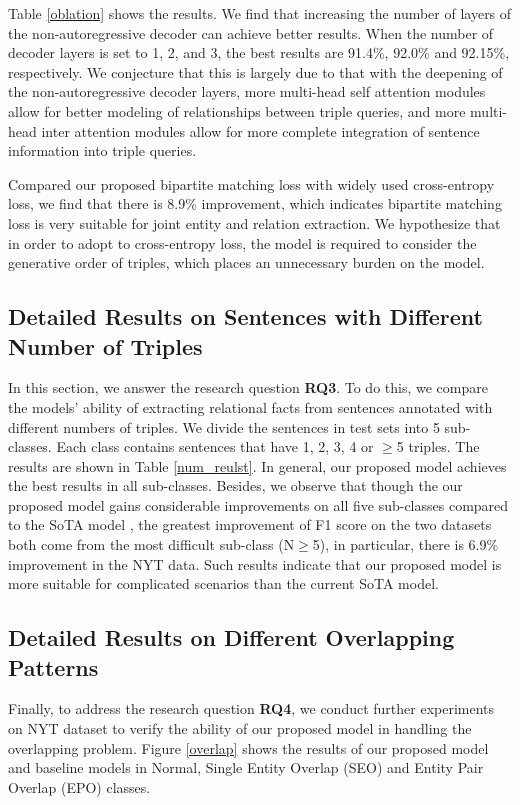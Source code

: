 \documentclass[letterpaper]{article} \usepackage{aaai21}  \usepackage{times}  \usepackage{helvet} \usepackage{courier}  \usepackage[hyphens]{url}  \usepackage{graphicx} \usepackage{amsfonts,amssymb}
\begin{document}
Table \ref{oblation} shows the results. We find that increasing the number of layers of the non-autoregressive decoder can achieve better results. When the number of decoder layers is set to 1, 2, and 3, the best results are 91.4\%, 92.0\% and 92.15\%, respectively. We conjecture that this is largely due to that with the deepening of the non-autoregressive decoder layers,  more multi-head self attention modules allow for better modeling of relationships between triple queries, and more multi-head inter attention modules allow for more complete integration of sentence information into triple queries. 

Compared our proposed bipartite matching loss with widely used cross-entropy loss, we find that there is 8.9\% improvement, which indicates bipartite matching loss is very suitable for joint entity and relation extraction. We hypothesize that in order to adopt to cross-entropy loss, the model is required to consider the generative order of triples, which places an unnecessary burden on the model.


\subsection{Detailed Results on Sentences with Different Number of Triples}
In this section, we answer the research question \textbf{RQ3}. To do this, we compare the models' ability of extracting relational facts from sentences annotated with different numbers of triples. We divide the sentences in test sets into 5 sub-classes. Each class contains sentences that have 1, 2, 3, 4 or $\geq$5 triples. The results are shown in Table \ref{num_reulst}. In general, our proposed model achieves the best results in all sub-classes. Besides, we observe that though the our proposed model gains considerable improvements on all five sub-classes compared to the SoTA model \cite{wei-etal-2020-novel}, the greatest improvement of F1 score on the two datasets both come from the most difficult sub-class (N$\geq$5), in particular, there is 6.9\% improvement in the NYT data. Such results indicate that our proposed model is more suitable for complicated scenarios than the current SoTA model.
\subsection{Detailed Results on Different Overlapping Patterns}
Finally, to address  the research question \textbf{RQ4}, we conduct further experiments on NYT dataset to verify the ability of our proposed model in handling the overlapping problem.  Figure \ref{overlap} shows the results of our proposed model and baseline models in Normal, Single Entity Overlap (SEO) and Entity Pair Overlap (EPO) classes. 
\end{document}
